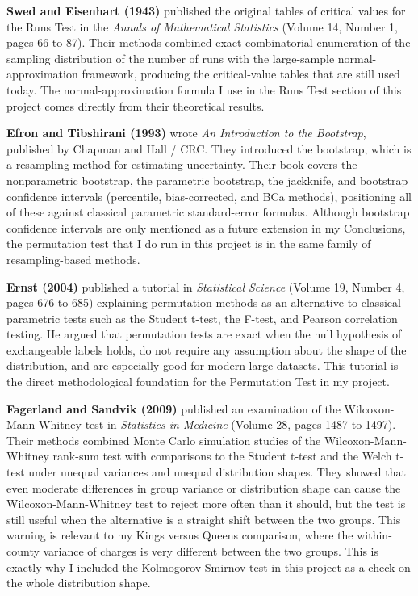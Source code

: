 \documentclass[12pt]{article}
\begin{document}
\textbf{Swed and Eisenhart (1943)} published the original tables of
critical values for the Runs Test in the \textit{Annals of
Mathematical Statistics} (Volume 14, Number 1, pages 66 to 87). Their
methods combined exact combinatorial enumeration of the sampling
distribution of the number of runs with the large-sample
normal-approximation framework, producing the critical-value tables
that are still used today. The normal-approximation formula I use in
the Runs Test section of this project comes directly from their
theoretical results.

\textbf{Efron and Tibshirani (1993)} wrote \textit{An Introduction to
the Bootstrap}, published by Chapman and Hall / CRC. They introduced
the bootstrap, which is a resampling method for estimating
uncertainty. Their book covers the nonparametric bootstrap, the
parametric bootstrap, the jackknife, and bootstrap confidence
intervals (percentile, bias-corrected, and BCa methods), positioning
all of these against classical parametric standard-error formulas.
Although bootstrap confidence intervals are only mentioned as a
future extension in my Conclusions, the permutation test that I do
run in this project is in the same family of resampling-based methods.

\textbf{Ernst (2004)} published a tutorial in \textit{Statistical
Science} (Volume 19, Number 4, pages 676 to 685) explaining
permutation methods as an alternative to classical parametric tests
such as the Student t-test, the F-test, and Pearson correlation
testing. He argued that permutation tests are exact when the null
hypothesis of exchangeable labels holds, do not require any assumption
about the shape of the distribution, and are especially good for
modern large datasets. This tutorial is the direct methodological
foundation for the Permutation Test in my project.

\textbf{Fagerland and Sandvik (2009)} published an examination of the
Wilcoxon-Mann-Whitney test in \textit{Statistics in Medicine} (Volume
28, pages 1487 to 1497). Their methods combined Monte Carlo simulation
studies of the Wilcoxon-Mann-Whitney rank-sum test with comparisons to
the Student t-test and the Welch t-test under unequal variances and
unequal distribution shapes. They showed that even moderate
differences in group variance or distribution shape can cause the
Wilcoxon-Mann-Whitney test to reject more often than it should, but
the test is still useful when the alternative is a straight shift
between the two groups. This warning is relevant to my Kings versus
Queens comparison, where the within-county variance of charges is
very different between the two groups. This is exactly why I included
the Kolmogorov-Smirnov test in this project as a check on the whole
distribution shape.
\end{document}
